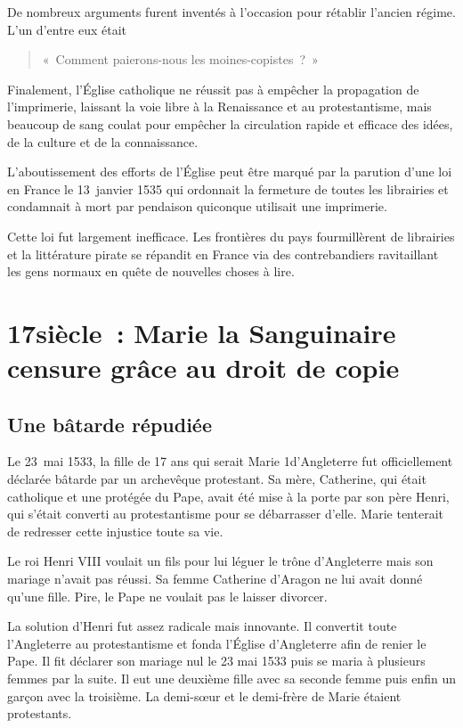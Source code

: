 De nombreux arguments furent inventés à l'occasion pour rétablir l'ancien régime. L'un d'entre eux était \begin{quotation}
     «~Comment paierons-nous les moines-copistes~?~»                                                                                                    
                                                                                                        \end{quotation}

Finalement, l'Église catholique ne réussit pas à empêcher la propagation de l'imprimerie,  laissant la voie libre à la Renaissance et au protestantisme, mais beaucoup de sang coulat pour empêcher la
circulation rapide et efficace des idées, de la culture et de la connaissance.

L'aboutissement des efforts de l'Église peut être marqué par la parution d'une loi en France le 13 janvier 1535 qui ordonnait la fermeture de toutes les librairies et condamnait à mort par pendaison
quiconque utilisait une imprimerie.

Cette loi fut largement inefficace. Les frontières du pays fourmillèrent de librairies et la littérature pirate se répandit en France via des contrebandiers ravitaillant les gens normaux en quête de
nouvelles choses à lire.

\section{17\ieme siècle~: Marie la Sanguinaire censure grâce au droit de copie}
\subsection{Une bâtarde répudiée}
Le 23 mai 1533, la fille de 17 ans qui serait Marie 1\ieme d'Angleterre fut officiellement déclarée bâtarde par un archevêque protestant. Sa mère, Catherine, qui était catholique et une protégée du
Pape,
avait
été mise à la porte par son père Henri, qui s'était converti au protestantisme pour se débarrasser d'elle. Marie tenterait de redresser cette injustice toute sa vie.

Le roi Henri VIII voulait un fils pour lui léguer le trône d'Angleterre mais son mariage n'avait pas réussi. Sa femme Catherine d'Aragon ne lui avait donné qu'une fille. Pire, le Pape ne voulait
pas le laisser divorcer.

La solution d'Henri fut assez radicale mais innovante. Il convertit toute l'Angleterre au protestantisme et fonda l'Église d'Angleterre afin de renier le Pape. Il fit déclarer son mariage nul le 23
mai 1533 puis se maria à plusieurs femmes par la suite. Il eut une deuxième fille avec sa seconde femme puis enfin un garçon avec la troisième. La demi-sœur et le demi-frère de Marie étaient
protestants. 

